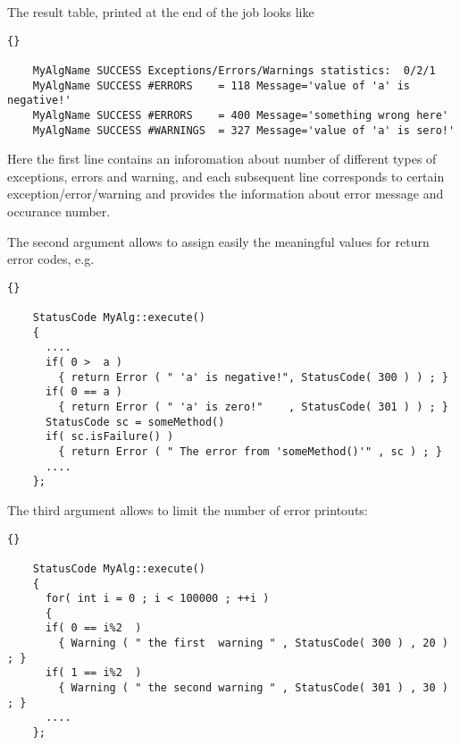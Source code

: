 \documentclass{lhcbnote}
\begin{document}
The result table, printed at the end of the job looks like 

\begin{scriptsize}
  \begin{lstlisting}{}

    MyAlgName SUCCESS Exceptions/Errors/Warnings statistics:  0/2/1
    MyAlgName SUCCESS #ERRORS    = 118 Message='value of 'a' is negative!'
    MyAlgName SUCCESS #ERRORS    = 400 Message='something wrong here'      
    MyAlgName SUCCESS #WARNINGS  = 327 Message='value of 'a' is sero!'    

  \end{lstlisting}
\end{scriptsize}

Here the first line contains an inforomation about number of different types 
of exceptions, errors and warning, and each subsequent line corresponds to 
certain exception/error/warning and provides the information about error 
message and occurance number.


The second argument allows to assign easily the 
meaningful values for return error codes, e.g.

\begin{scriptsize}
 \begin{lstlisting}{}

    StatusCode MyAlg::execute() 
    {
      ....
      if( 0 >  a ) 
        { return Error ( " 'a' is negative!", StatusCode( 300 ) ) ; }
      if( 0 == a ) 
        { return Error ( " 'a' is zero!"    , StatusCode( 301 ) ) ; }
      StatusCode sc = someMethod() 
      if( sc.isFailure() ) 
        { return Error ( " The error from 'someMethod()'" , sc ) ; }
      ....
    };

 \end{lstlisting}
\end{scriptsize}

The third argument allows to limit the number of 
error printouts:

\begin{scriptsize}
 \begin{lstlisting}{}

    StatusCode MyAlg::execute() 
    {
      for( int i = 0 ; i < 100000 ; ++i ) 
      {
      if( 0 == i%2  ) 
        { Warning ( " the first  warning " , StatusCode( 300 ) , 20 ) ; }
      if( 1 == i%2  ) 
        { Warning ( " the second warning " , StatusCode( 301 ) , 30 ) ; }
      ....
    };

 \end{lstlisting}
\end{scriptsize}
\end{document}
